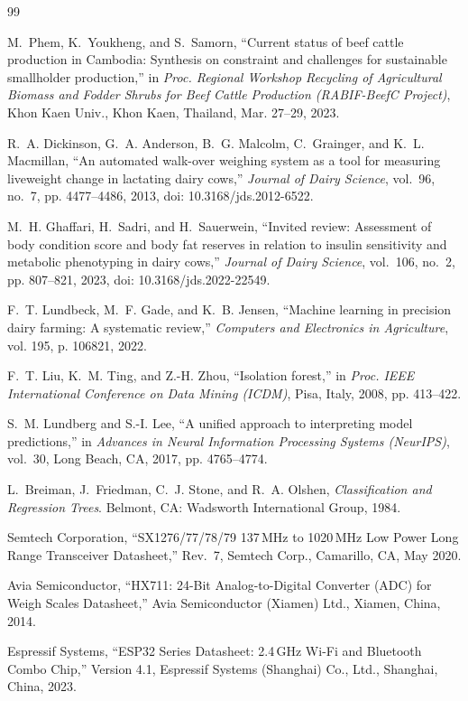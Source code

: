\documentclass[11pt,a4paper]{report}
\begin{document}
\clearpage

\begin{thebibliography}{99}

M.~Phem, K.~Youkheng, and S.~Samorn, ``Current status of beef cattle production in Cambodia: Synthesis on constraint and challenges for sustainable smallholder production,'' in \emph{Proc. Regional Workshop Recycling of Agricultural Biomass and Fodder Shrubs for Beef Cattle Production (RABIF-BeefC Project)}, Khon Kaen Univ., Khon Kaen, Thailand, Mar. 27--29, 2023.

R.~A. Dickinson, G.~A. Anderson, B.~G. Malcolm, C.~Grainger, and K.~L. Macmillan, ``An automated walk-over weighing system as a tool for measuring liveweight change in lactating dairy cows,'' \emph{Journal of Dairy Science}, vol.~96, no.~7, pp. 4477--4486, 2013, doi: 10.3168/jds.2012-6522.

M.~H. Ghaffari, H.~Sadri, and H.~Sauerwein, ``Invited review: Assessment of body condition score and body fat reserves in relation to insulin sensitivity and metabolic phenotyping in dairy cows,'' \emph{Journal of Dairy Science}, vol.~106, no.~2, pp. 807--821, 2023, doi: 10.3168/jds.2022-22549.

F.~T. Lundbeck, M.~F. Gade, and K.~B. Jensen, ``Machine learning in precision dairy farming: A systematic review,'' \emph{Computers and Electronics in Agriculture}, vol. 195, p. 106821, 2022.

F.~T. Liu, K.~M. Ting, and Z.-H. Zhou, ``Isolation forest,'' in \emph{Proc. IEEE International Conference on Data Mining (ICDM)}, Pisa, Italy, 2008, pp. 413--422.

S.~M. Lundberg and S.-I. Lee, ``A unified approach to interpreting model predictions,'' in \emph{Advances in Neural Information Processing Systems (NeurIPS)}, vol.~30, Long Beach, CA, 2017, pp. 4765--4774.

L.~Breiman, J.~Friedman, C.~J. Stone, and R.~A. Olshen, \emph{Classification and Regression Trees}. Belmont, CA: Wadsworth International Group, 1984.

Semtech Corporation, ``SX1276/77/78/79 137\,MHz to 1020\,MHz Low Power Long Range Transceiver Datasheet,'' Rev.~7, Semtech Corp., Camarillo, CA, May 2020.

Avia Semiconductor, ``HX711: 24-Bit Analog-to-Digital Converter (ADC) for Weigh Scales Datasheet,'' Avia Semiconductor (Xiamen) Ltd., Xiamen, China, 2014.

Espressif Systems, ``ESP32 Series Datasheet: 2.4\,GHz Wi-Fi and Bluetooth Combo Chip,'' Version 4.1, Espressif Systems (Shanghai) Co., Ltd., Shanghai, China, 2023.

\end{thebibliography}
\end{document}
